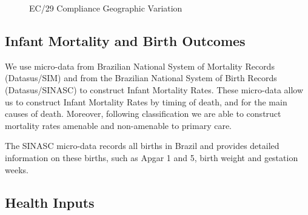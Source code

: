 \begin{figure}[h]
\begin{center}
    \caption{EC/29 Compliance Geographic Variation}
\end{center}
\end{figure}

\subsection{Infant Mortality and Birth Outcomes}

We use micro-data from Brazilian National System of Mortality Records (Datasus/SIM) and from the Brazilian National System of Birth Records (Datasus/SINASC) to construct Infant Mortality Rates. These micro-data allow us to construct Infant Mortality Rates by timing of death, and for the main causes of death. Moreover, following \cite{alfradique2009internaccoes} classification we are able to construct mortality rates amenable and non-amenable to primary care.

The SINASC micro-data records all births in Brazil and provides detailed information on these births, such as Apgar 1 and 5, birth weight and gestation weeks.

\subsection{Health Inputs}

